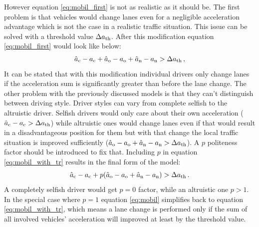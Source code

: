 \documentclass[a4paper,12pt,twoside]{report} %
\begin{document}
			However equation \ref{eq:mobil_first} is not as realistic as it should be. The first problem is that vehicles would change lanes  even for a negligible acceleration advantage which is not the case in a realistic traffic situation. This issue can be solved with a threshold value $\Delta  a_{\rm th}$. After this modification equation \ref{eq:mobil_first} would look like below:
			\begin{equation}
				\hat{a}_{\rm c} - a_{\rm c} + \hat{a}_{\rm o} - a_{\rm o} + \hat{a}_{\rm n} - a_{\rm n} > \Delta  a_{\rm th}\,,
				\label{eq:mobil_with_tr}
			\end{equation}
			It can be stated that with this modification individual drivers only change lanes if the acceleration sum is significantly greater than before the lane change. The other problem with the previously discussed models is that they can't distinguish between driving style. Driver styles can vary from complete selfish to the altruistic driver. Selfish drivers would only care about  their own acceleration ($\hat{a}_{\rm c} - a_{\rm c} > \Delta  a_{\rm th}$) while altruistic ones would change lanes even if that would result in a disadvantageous position for them but with that change the local traffic situation is improved sufficiently ($\hat{a}_{\rm o} - a_{\rm o} + \hat{a}_{\rm n} - a_{\rm n} > \Delta  a_{\rm th}$). A $p$ politeness factor should be introduced to fix that. Including $p$ in equation \ref{eq:mobil_with_tr} results in the final form of the model:
			\begin{equation}
				\hat{a}_{\rm c} - a_{\rm c} + p(\hat{a}_{\rm o} - a_{\rm o} + \hat{a}_{\rm n} - a_{\rm n}) > \Delta  a_{\rm th}\,.
				\label{eq:mobil}
			\end{equation}
			A completely selfish driver would get $p=0$ factor, while an altruistic one $p>1$. In the special case where $p=1$ equation \ref{eq:mobil} simplifies back to equation \ref{eq:mobil_with_tr}, which means a lane change is performed only if the sum of all involved vehicles' acceleration will improved at least by the threshold value.
\end{document}
